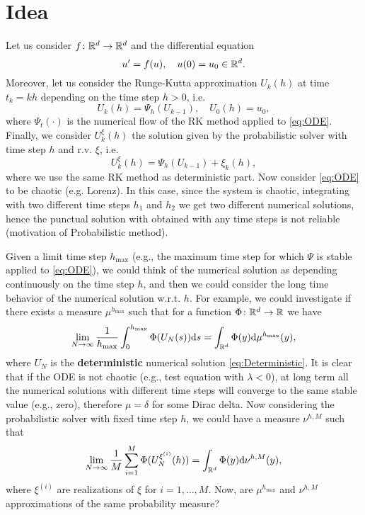 \documentclass{scrartcl}
\begin{document}
	
\section*{Idea}

Let us consider $f\colon \mathbb{R}^d \to \mathbb{R}^d$ and the differential equation
\begin{equation}\label{eq:ODE}
	u' = f(u), \quad u(0) = u_0 \in \mathbb{R}^d.
\end{equation}
Moreover, let us consider the Runge-Kutta approximation $U_k(h)$ at time $t_k = kh$ depending on the time step $h > 0$, i.e.
\begin{equation}\label{eq:Deterministic}
	U_k(h) = \Psi_h(U_{k-1}), \quad U_0(h) = u_0,
\end{equation} 
where $\Psi_t(\cdot)$ is the numerical flow of the RK method applied to \eqref{eq:ODE}. Finally, we consider $U_k^\xi(h)$ the solution given by the probabilistic solver with time step $h$ and r.v. $\xi$, i.e.
\begin{equation}\label{eq:Probabilistic}
	U_k^\xi(h) = \Psi_h(U_{k-1}) + \xi_k(h),
\end{equation}
where we use the same RK method as deterministic part. Now consider \eqref{eq:ODE} to be chaotic (e.g. Lorenz). In this case, since the system is chaotic, integrating with two different time steps $h_1$ and $h_2$ we get two different numerical solutions, hence the punctual solution with obtained with any time steps is not reliable (motivation of Probabilistic method).

Given a limit time step $h_{\max}$ (e.g., the maximum time step for which $\Psi$ is stable applied to \eqref{eq:ODE}), we could think of the numerical solution as depending continuously on the time step $h$, and then we could consider the long time behavior of the numerical solution w.r.t. $h$. For example, we could investigate if there exists a measure $\mu^{h_{\max}}$ such that for a function $\Phi\colon\mathbb{R}^d\to\mathbb{R}$ we have 
\begin{equation}\label{eq:detEquality}
	\lim_{N\to\infty} \frac{1}{h_{\max}} \int_{0}^{h_{\max}} \Phi(U_N(s))\dd s =
	\int_{\mathbb{R}^d} \Phi(y)\dd \mu^{h_{\max}}(y),
\end{equation}
where $U_N$ is the \textbf{deterministic} numerical solution \eqref{eq:Deterministic}. It is clear that if the ODE is not chaotic (e.g., test equation with $\lambda < 0$), at long term all the numerical solutions with different time steps will converge to the same stable value (e.g., zero), therefore $\mu = \delta$ for some Dirac delta. Now considering the probabilistic solver with fixed time step $h$, we could have a measure $\nu^{h,M}$ such that
\begin{equation}\label{eq:probEquality}
	\lim_{N\to\infty} \frac{1}{M} \sum_{i=1}^M \Phi(U_N^{\xi^{(i)}}(h)) =  
	\int_{\mathbb{R}^d} \Phi(y)\dd \nu^{h,M}(y),
\end{equation}
where $\xi^{(i)}$ are realizations of $\xi$ for $i = 1, \ldots, M$. Now, are $\mu^{h_{\max}}$ and $\nu^{h,M}$ approximations of the same probability measure?
\end{document}
